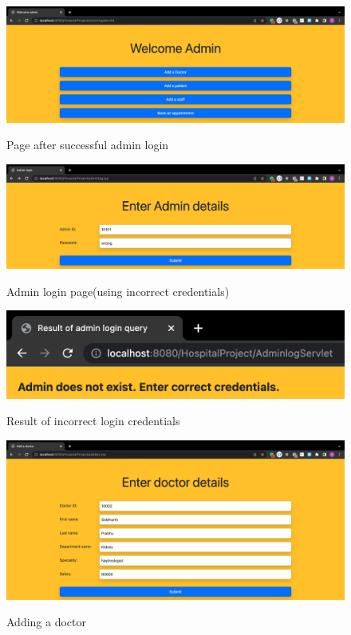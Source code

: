 \documentclass[12pt]{article}
\begin{document}
\newpage

\begin{figure}[!hbt]
    \centering
    \includegraphics[scale=0.35]{screenshots/2c.png}
    \label{fig:data}
    \caption{Page after successful admin login}
\end{figure}

\begin{figure}[!hbt]
    \centering
    \includegraphics[scale=0.35]{screenshots/2d.png}
    \label{fig:my_label1}
    \caption{Admin login page(using incorrect credentials)}
\end{figure}

\begin{figure}[!hbt]
    \centering
    \includegraphics[scale=0.8]{screenshots/2e.png}
    \label{fig:data}
    \caption{Result of incorrect login credentials}
\end{figure}

\newpage

\begin{figure}[!hbt]
    \centering
    \includegraphics[scale=0.35]{screenshots/2f.png}
    \label{fig:my_label1}
    \caption{Adding a doctor}
\end{figure}
\end{document}
